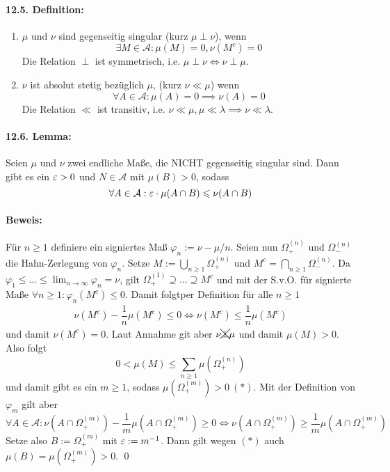 \documentclass[11pt]{report}
\begin{document}
     \paragraph{12.5. Definition:} 
     \begin{enumerate}[label=(\roman*)]
         \item $\mu$ und $\nu$ sind gegenseitig singular (kurz $\mu\perp\nu$), wenn
         $$\exists M\in\mathcal{A}:\mu(M)=0, \nu(M^c)=0$$
         Die Relation $\perp$ ist symmetrisch, i.e. $\mu\perp\nu\iff\nu\perp\mu$.
         \item $\nu$ ist absolut stetig bez\"uglich $\mu$, (kurz $\nu\ll\mu$) wenn
         $$\forall A\in\mathcal{A}: \mu(A)=0\implies\nu(A)=0$$
         Die Relation $\ll$ ist transitiv, i.e. $\nu\ll\mu,\mu\ll\lambda\implies\nu\ll\lambda$.
     \end{enumerate}
     
     \paragraph{12.6. Lemma:} Seien $\mu$ und $\nu$ zwei endliche Ma\ss{}e, die NICHT gegenseitig singular sind. Dann gibt es ein $\varepsilon>0$ und $N\in\mathcal{A}$ mit $\mu(B)>0$, sodass
     $$\forall A\in\mathcal{A}:\varepsilon\cdot\mu(A\cap B)\leqslant\nu(A\cap B)$$
     
     \paragraph{Beweis: }F\"ur $n\geq1$ definiere ein signiertes Ma\ss{} $\varphi_n:=\nu-\mu/n$. Seien nun $\Omega^{(n)}_+$ und $\Omega^{(n)}_-$ die Hahn-Zerlegung von $\varphi_n$. Setze $M:=\bigcup_{n\geq1}\Omega^{(n)}_+$ und $M^c=\bigcap_{n\geq1}\Omega^{(n)}_-$. Da $\varphi_1\leq\hdots\leq\displaystyle\lim_{n\to\infty}\varphi_n=\nu$, gilt $\Omega^{(1)}_+\supseteq\hdots\supseteq M^c$ und mit der S.v.O. f\"ur signierte Ma\ss{}e $\forall n\geq1:\varphi_n(M^c)\leq0$. \newline Damit folgtper Definition f\"ur alle $n\geq1$
     \begin{align*}
         \nu(M^c)-\dfrac{1}{n}\mu(M^c)\leq0 \iff \nu(M^c)\leq\dfrac{1}{n}\mu(M^c)
     \end{align*}
     und damit $\nu(M^c)=0$. Laut Annahme git aber $\nu\xcancel{\perp}\mu$ und damit $\mu(M)>0$. Also folgt
     $$0<\mu(M)\leq\sum_{n\geq1}\mu(\Omega^{(n)}_+)$$
     und damit gibt es ein $m\geq1$, sodass $\mu(\Omega^{(m)}_+)>0\ (*)$. Mit der Definition von $\varphi_m$ gilt aber
     $$\forall A\in\mathcal{A}:\nu(A\cap \Omega^{(m)}_+)-\dfrac{1}{m}\mu(A\cap \Omega^{(m)}_+)\geq0\iff\nu(A\cap \Omega^{(m)}_+)\geq\dfrac{1}{m}\mu(A\cap \Omega^{(m)}_+)$$
     Setze also $B:=\Omega^{(m)}_+$ mit $\varepsilon:=m^{-1}$. Dann gilt wegen $(*)$ auch $\mu(B)=\mu(\Omega^{(m)}_+)>0$. \qed
     
\end{document}
